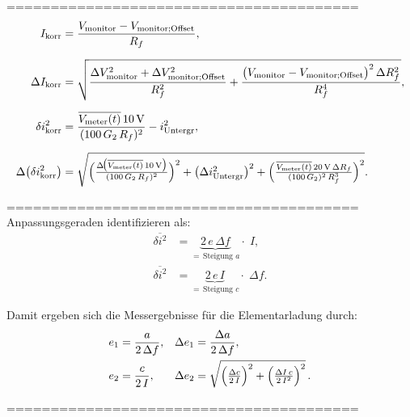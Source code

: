 ========================================\\

\begin{align}
I_{\mathrm{korr}} 
&= \frac{V_{\mathrm{monitor}} - V_{\mathrm{monitor;Offset}}}{R_f}, \\[6pt]
\Delta I_{\mathrm{korr}}
&= \sqrt{ 
     \frac{\Delta V_{\mathrm{monitor}}^2 + \Delta V_{\mathrm{monitor;Offset}}^2}{R_f^2}
     + \frac{\bigl(V_{\mathrm{monitor}} - V_{\mathrm{monitor;Offset}}\bigr)^2\,\Delta R_f^2}{R_f^4}
   }, \\[6pt]
\delta i_{\mathrm{korr}}^2
&= \frac{\overline{V_{\mathrm{meter}}(t)}\,10\,\mathrm{V}}{(100\,G_2\,R_f)^2}
  - i_{\mathrm{Untergr}}^2, \\[6pt]
\Delta\bigl(\delta i_{\mathrm{korr}}^2\bigr)
&= \sqrt{
     \Bigl(\tfrac{\Delta\!\bigl(\overline{V_{\mathrm{meter}}(t)}\,10\,\mathrm{V}\bigr)}{(100\,G_2\,R_f)^2}\Bigr)^2
     + \bigl(\Delta i_{\mathrm{Untergr}}^2\bigr)^2
     + \Bigl(\tfrac{\overline{V_{\mathrm{meter}}(t)}\,20\,\mathrm{V}\,\Delta R_f}{(100\,G_2)^2\,R_f^3}\Bigr)^2
   }.
\end{align}


========================================\\

Anpassungsgeraden identifizieren als:
\begin{align}
  \overline{\delta i^2}
    &= \underbrace{2\,e\,\Delta f}_{=\,\text{Steigung }a} \cdot \;I, \\[6pt]
  \overline{\delta i^2}
    &= \underbrace{2\,e\,I}_{=\,\text{Steigung }c} \cdot \;\Delta f.
\end{align}


Damit ergeben sich die Messergebnisse für die Elementarladung durch:
\begin{align}
  e_1 &= \frac{a}{2\,\Delta f}, 
  &\Delta e_1 &= \frac{\Delta a}{2\,\Delta f},\\
  e_2 &= \frac{c}{2\,I}, 
  &\Delta e_2 &= \sqrt{\Bigl(\tfrac{\Delta c}{2\,I}\Bigr)^2 
                    + \Bigl(\tfrac{\Delta I\,c}{2\,I^2}\Bigr)^2}\,.
\end{align}

========================================\\

